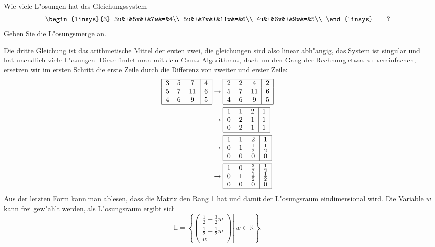 Wie viele L"osungen hat das Gleichungssystem
\[
\begin{linsys}{3}
3u&+&5v&+&7w&=&4\\
5u&+&7v&+&11w&=&6\\
4u&+&6v&+&9w&=&5\\
\end{linsys}
\qquad
?
\]
Geben Sie die L"osungsmenge an.

\begin{loesung}
Die dritte Gleichung ist das arithmetische Mittel der ersten zwei,
die gleichungen sind also linear abh"angig, das System ist singular
und hat unendlich viele L"osungen. Diese findet man mit dem
Gauss-Algorithmus, doch um den Gang der Rechnung etwas zu vereinfachen,
ersetzen wir im ersten Schritt die erste Zeile durch die Differenz von
zweiter und erster Zeile:
\begin{align*}
\begin{tabular}{|ccc|c|}
\hline
3&5&7&4\\
5&7&11&6\\
4&6&9&5\\
\hline
\end{tabular}
&\rightarrow
\begin{tabular}{|ccc|c|}
\hline
2&2&4&2\\
5&7&11&6\\
4&6&9&5\\
\hline
\end{tabular}
\\
&\rightarrow
\begin{tabular}{|ccc|c|}
\hline
1&1&2&1\\
0&2&1&1\\
0&2&1&1\\
\hline
\end{tabular}
\\
&\rightarrow
\begin{tabular}{|ccc|c|}
\hline
1&1&2&1\\
0&1&$\frac12$&$\frac12$\\
0&0&0&0\\
\hline
\end{tabular}
\\
&\rightarrow
\begin{tabular}{|ccc|c|}
\hline
1&0&$\frac32$&$\frac12$\\
0&1&$\frac12$&$\frac12$\\
0&0&0&0\\
\hline
\end{tabular}
\end{align*}
Aus der letzten Form kann man ablesen, dass die Matrix den
Rang 1 hat und damit der L"osungsraum eindimensional wird.
Die Variable $w$ kann frei gew"ahlt werden, als L"osungsraum
ergibt sich
\[
{\mathbb L}=\left\{\left.\begin{pmatrix}\frac12-\frac32w\\\frac12-\frac12w\\w\end{pmatrix}\right|\;w\in\mathbb R\right\}.
\]
\end{loesung}

